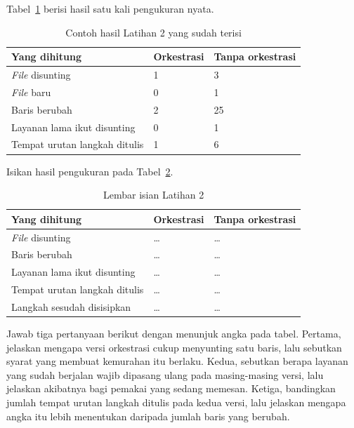 Tabel~\ref{tab:lat2odsoa-contoh} berisi hasil satu kali pengukuran nyata.

\begin{table}[htbp]
  \centering
  \caption{Contoh hasil Latihan 2 yang sudah terisi}
  \label{tab:lat2odsoa-contoh}
  \begin{tabularx}{\textwidth}{|X|l|l|}
    \hline
    \textbf{Yang dihitung} & \textbf{Orkestrasi} & \textbf{Tanpa orkestrasi} \\
    \hline
    \textit{File} disunting & 1 & 3 \\
    \hline
    \textit{File} baru & 0 & 1 \\
    \hline
    Baris berubah & 2 & 25 \\
    \hline
    Layanan lama ikut disunting & 0 & 1 \\
    \hline
    Tempat urutan langkah ditulis & 1 & 6 \\
    \hline
  \end{tabularx}
\end{table}

Isikan hasil pengukuran pada Tabel~\ref{tab:lat2odsoa-hasil}.

\begin{table}[htbp]
  \centering
  \caption{Lembar isian Latihan 2}
  \label{tab:lat2odsoa-hasil}
  \begin{tabularx}{\textwidth}{|X|l|l|}
    \hline
    \textbf{Yang dihitung} & \textbf{Orkestrasi} & \textbf{Tanpa orkestrasi} \\
    \hline
    \textit{File} disunting & \dots & \dots \\
    \hline
    Baris berubah & \dots & \dots \\
    \hline
    Layanan lama ikut disunting & \dots & \dots \\
    \hline
    Tempat urutan langkah ditulis & \dots & \dots \\
    \hline
    Langkah sesudah disisipkan & \dots & \dots \\
    \hline
  \end{tabularx}
\end{table}

Jawab tiga pertanyaan berikut dengan menunjuk angka pada tabel. Pertama,
jelaskan mengapa versi orkestrasi cukup menyunting satu baris, lalu sebutkan
syarat yang membuat kemurahan itu berlaku. Kedua, sebutkan berapa layanan yang
sudah berjalan wajib dipasang ulang pada masing-masing versi, lalu jelaskan
akibatnya bagi pemakai yang sedang memesan. Ketiga, bandingkan jumlah tempat
urutan langkah ditulis pada kedua versi, lalu jelaskan mengapa angka itu lebih
menentukan daripada jumlah baris yang berubah.

